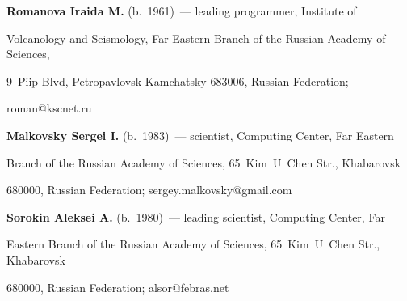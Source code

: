 \vspace*{1pt}





\noindent


\textbf{Romanova Iraida M.} (b.\ 1961)~--- leading programmer, Institute of 


Volcanology and Seismology, Far Eastern Branch of the Russian Academy of Sciences, 


9~Piip Blvd, Petropavlovsk-Kamchatsky 683006, Russian Federation; 


\mbox{roman@kscnet.ru}





\vspace*{1pt}





\noindent


\textbf{Malkovsky Sergei I.} (b.\ 1983)~--- scientist, Computing Center, Far Eastern 


Branch of the Russian Academy of Sciences, 65~Kim~U~Chen Str., Khabarovsk 


680000, Russian Federation; \mbox{sergey.malkovsky@gmail.com}








\vspace*{1pt}





\noindent


\textbf{Sorokin Aleksei A.} (b.\ 1980)~--- leading scientist, Computing Center, Far 


Eastern Branch of the Russian Academy of Sciences, 65~Kim~U~Chen Str., Khabarovsk 


680000, Russian Federation; \mbox{alsor@febras.net}








\label{end\stat}








\renewcommand{\bibname}{\protect\rm Литература}



